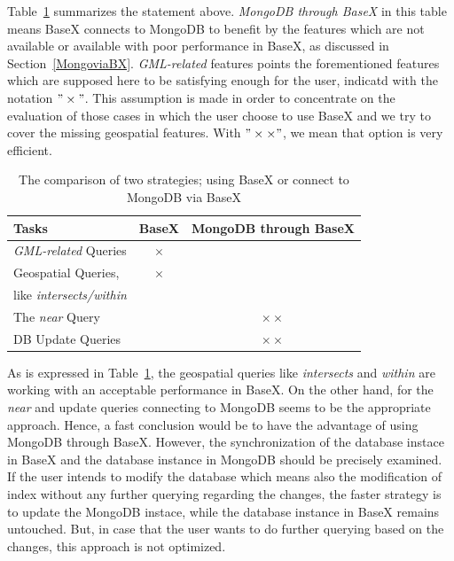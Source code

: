 \documentclass[a4paper,12pt]{article}
\begin{document}

Table~\ref{t.comparisonBaseXMongo} summarizes the statement above. \textit{MongoDB through BaseX} in this table means BaseX connects to MongoDB to benefit by the features which are not available or available with poor performance in BaseX, as discussed in Section~\ref{MongoviaBX}. \textit{GML-related} features points the forementioned features which are supposed here to be satisfying enough for the user, indicatd with the notation $"\times"$. This assumption is made in order to concentrate on the evaluation of those cases in which the user choose to use BaseX and we try to cover the missing geospatial features.
With $"\times\times"$, we mean that option is very efficient.
\vspace{10px}
\begin{table}
\centering
\begin{tabular}{|l | c | c|}\hline
\textbf{Tasks} & \textbf{BaseX} & \textbf{MongoDB through BaseX}\\\hline
 \textit{GML-related} Queries & $\times$ &\\\hline
 Geospatial Queries,  & $\times$ &\\
like \textit{intersects/within} & & \\\hline
 The \textit{near} Query & &$\times\times$ \\\hline
 DB Update Queries & &$\times\times$ 
\\\hline
\end{tabular}
\caption{The comparison of two strategies; using BaseX or connect to MongoDB via BaseX}
\label{t.comparisonBaseXMongo}
\end{table}
\vspace{10px}

As is expressed in Table~\ref{t.comparisonBaseXMongo}, the geospatial queries like \textit{intersects} and \textit{within} are working with an acceptable performance in BaseX. On the other hand, for the \textit{near} and update queries connecting to MongoDB seems to be the appropriate approach. Hence, a fast conclusion would be to have the advantage of using MongoDB through BaseX. However, the synchronization of the database instace in BaseX and the database instance in MongoDB should be precisely examined. If the user intends to modify the database which means also the modification of index without any further querying regarding the changes, the faster strategy is to update the MongoDB instace, while the database instance in BaseX remains untouched. But, in case that the user wants to do further querying based on the changes, this approach is not optimized.  
\end{document}
